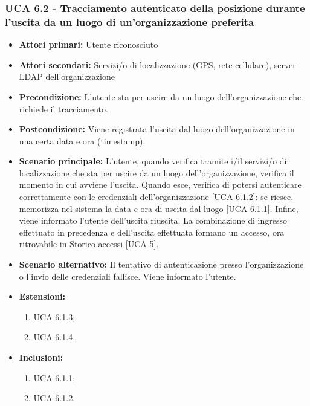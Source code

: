 \subsubsection{UCA 6.2 - Tracciamento autenticato della posizione durante l'uscita da un luogo di un'organizzazione preferita}
\begin{itemize}
	\item \textbf{Attori primari:} Utente riconosciuto
	\item \textbf{Attori secondari:} Servizi/o di localizzazione (GPS, rete cellulare), server LDAP dell'organizzazione
	\item \textbf{Precondizione:} L'utente sta per uscire da un luogo dell'organizzazione che richiede il tracciamento.
	\item \textbf{Postcondizione:} Viene registrata l'uscita dal luogo dell'organizzazione in una certa data e ora (timestamp).
	\item \textbf{Scenario principale:} L'utente, quando verifica tramite i/il servizi/o di localizzazione che sta per uscire da un luogo dell'organizzazione, verifica il momento in cui avviene l'uscita. Quando esce, verifica di potersi autenticare correttamente con le credenziali dell'organizzazione [UCA 6.1.2]: se riesce, memorizza nel sistema la data e ora di uscita dal luogo [UCA 6.1.1]. Infine, viene informato l'utente dell'uscita riuscita. La combinazione di ingresso effettuato in precedenza e dell'uscita effettuata formano un accesso, ora ritrovabile in Storico accessi [UCA 5].
	\item \textbf{Scenario alternativo:} Il tentativo di autenticazione presso l'organizzazione o l'invio delle credenziali fallisce. Viene informato l'utente.
	\item \textbf{Estensioni:}
	\begin{enumerate}
		\item UCA 6.1.3;
		\item UCA 6.1.4.
	\end{enumerate}
	\item \textbf{Inclusioni:}
	\begin{enumerate}
		\item UCA 6.1.1;
		\item UCA 6.1.2.
	\end{enumerate}
\end{itemize}

